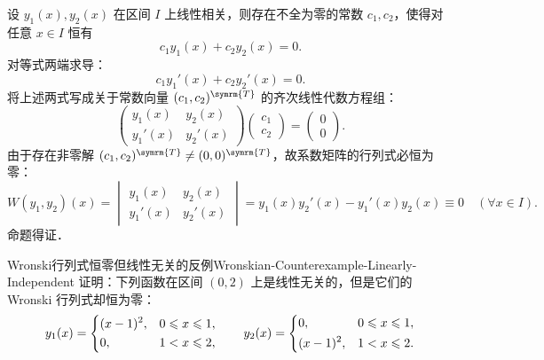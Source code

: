 \begin{myproof}
    设 $y_1(x), y_2(x)$ 在区间 $I$ 上线性相关，则存在不全为零的常数 $c_1, c_2$，使得对任意 $x \in I$ 恒有
    \begin{equation}
        c_1 y_1(x) + c_2 y_2(x) = 0.
    \end{equation}
    对等式两端求导：
    \begin{equation}
        c_1 y_1'(x) + c_2 y_2'(x) = 0.
    \end{equation}
    将上述两式写成关于常数向量 $(c_1, c_2)^{\symrm{T}}$ 的齐次线性代数方程组：
    \begin{equation}
        \begin{pmatrix}
            y_1(x)  & y_2(x)  \\
            y_1'(x) & y_2'(x)
        \end{pmatrix}
        \begin{pmatrix}
            c_1 \\
            c_2
        \end{pmatrix}
        =
        \begin{pmatrix}
            0 \\
            0
        \end{pmatrix}.
    \end{equation}
    由于存在非零解 $(c_1, c_2)^{\symrm{T}} \neq (0, 0)^{\symrm{T}}$，故系数矩阵的行列式必恒为零：
    \begin{equation}
        W(y_1, y_2)(x) =
        \begin{vmatrix}
            y_1(x)  & y_2(x)  \\
            y_1'(x) & y_2'(x)
        \end{vmatrix}
        = y_1(x)y_2'(x) - y_1'(x)y_2(x) \equiv 0 \quad (\forall x \in I).
    \end{equation}
    命题得证．
\end{myproof}

\begin{problem}{Wronski行列式恒零但线性无关的反例}{Wronskian-Counterexample-Linearly-Independent}
    证明：下列函数在区间 $(0, 2)$ 上是线性无关的，但是它们的 Wronski 行列式却恒为零：
    \begin{equation}
        y_1(x) = \begin{dcases} (x-1)^2, & 0 \leqslant x \leqslant 1, \\ 0, & 1 < x \leqslant 2, \end{dcases} \qquad y_2(x) = \begin{dcases} 0, & 0 \leqslant x \leqslant 1, \\ (x-1)^2, & 1 < x \leqslant 2. \end{dcases}
    \end{equation}
\end{problem}

